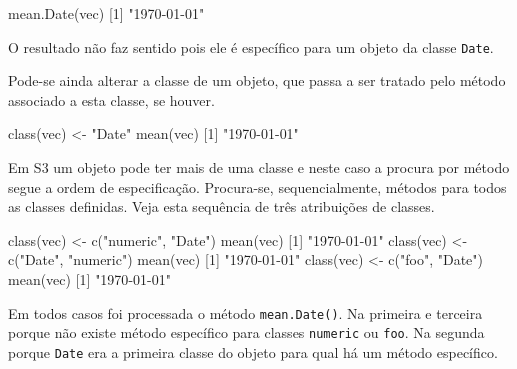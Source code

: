 \documentclass[
  10pt,
  a4paper]{book}
\newenvironment{Shaded}{\begin{snugshade}}{\end{snugshade}}
\newcommand{\DecValTok}[1]{\textcolor[rgb]{0.00,0.00,0.81}{#1}}
\newcommand{\FunctionTok}[1]{\textcolor[rgb]{0.00,0.00,0.00}{#1}}
\newcommand{\NormalTok}[1]{#1}
\newcommand{\OtherTok}[1]{\textcolor[rgb]{0.56,0.35,0.01}{#1}}
\newcommand{\StringTok}[1]{\textcolor[rgb]{0.31,0.60,0.02}{#1}}
\begin{document}
\begin{Shaded}
\begin{Highlighting}[]
\FunctionTok{mean.Date}\NormalTok{(vec)}
\NormalTok{[}\DecValTok{1}\NormalTok{] }\StringTok{"1970{-}01{-}01"}
\end{Highlighting}
\end{Shaded}

O resultado não faz sentido pois ele é específico para um objeto da
classe \texttt{Date}.

Pode-se ainda alterar a classe de um objeto, que passa a ser tratado
pelo método associado a esta classe, se houver.

\begin{Shaded}
\begin{Highlighting}[]
\FunctionTok{class}\NormalTok{(vec) }\OtherTok{\textless{}{-}} \StringTok{"Date"}
\FunctionTok{mean}\NormalTok{(vec)}
\NormalTok{[}\DecValTok{1}\NormalTok{] }\StringTok{"1970{-}01{-}01"}
\end{Highlighting}
\end{Shaded}

Em S3 um objeto pode ter mais de uma classe e neste caso a procura por método segue a ordem de especificação.
Procura-se, sequencialmente, métodos para todos as classes definidas.
Veja esta sequência de três atribuições de classes.

\begin{Shaded}
\begin{Highlighting}[]
\FunctionTok{class}\NormalTok{(vec) }\OtherTok{\textless{}{-}} \FunctionTok{c}\NormalTok{(}\StringTok{"numeric"}\NormalTok{, }\StringTok{"Date"}\NormalTok{)}
\FunctionTok{mean}\NormalTok{(vec)}
\NormalTok{[}\DecValTok{1}\NormalTok{] }\StringTok{"1970{-}01{-}01"}
\FunctionTok{class}\NormalTok{(vec) }\OtherTok{\textless{}{-}} \FunctionTok{c}\NormalTok{(}\StringTok{"Date"}\NormalTok{, }\StringTok{"numeric"}\NormalTok{)}
\FunctionTok{mean}\NormalTok{(vec)}
\NormalTok{[}\DecValTok{1}\NormalTok{] }\StringTok{"1970{-}01{-}01"}
\FunctionTok{class}\NormalTok{(vec) }\OtherTok{\textless{}{-}} \FunctionTok{c}\NormalTok{(}\StringTok{"foo"}\NormalTok{, }\StringTok{"Date"}\NormalTok{)}
\FunctionTok{mean}\NormalTok{(vec)}
\NormalTok{[}\DecValTok{1}\NormalTok{] }\StringTok{"1970{-}01{-}01"}
\end{Highlighting}
\end{Shaded}

Em todos casos foi processada o método \texttt{mean.Date()}.
Na primeira e terceira porque não existe método específico para
classes \texttt{numeric} ou \texttt{foo}. Na segunda porque \texttt{Date} era a primeira classe
do objeto para qual há um método específico.
\end{document}

